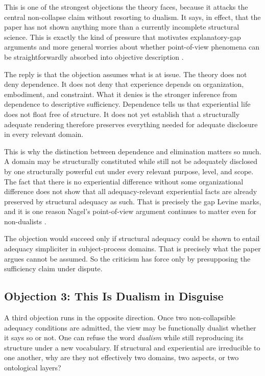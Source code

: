 \documentclass[11pt]{article}
\renewcommand{\emph}[1]{\textit{#1}}
\begin{document}
This is one of the strongest objections the theory faces, because it attacks the central non-collapse claim without resorting to dualism. It says, in effect, that the paper has not shown anything more than a currently incomplete structural science. This is exactly the kind of pressure that motivates explanatory-gap arguments and more general worries about whether point-of-view phenomena can be straightforwardly absorbed into objective description \cite{Nagel1974,Levine1983,Chalmers1995}.

The reply is that the objection assumes what is at issue. The theory does not deny dependence. It does not deny that experience depends on organization, embodiment, and constraint. What it denies is the stronger inference from dependence to descriptive sufficiency. Dependence tells us that experiential life does not float free of structure. It does not yet establish that a structurally adequate rendering therefore preserves everything needed for adequate disclosure in every relevant domain.

This is why the distinction between dependence and elimination matters so much. A domain may be structurally constituted while still not be adequately disclosed by one structurally powerful cut under every relevant purpose, level, and scope. The fact that there is no experiential difference without some organizational difference does not show that all adequacy-relevant experiential facts are already preserved by structural adequacy as such. That is precisely the gap Levine marks, and it is one reason Nagel's point-of-view argument continues to matter even for non-dualists \cite{Nagel1974,Levine1983}.

The objection would succeed only if structural adequacy could be shown to entail adequacy simpliciter in subject-process domains. That is precisely what the paper argues cannot be assumed. So the criticism has force only by presupposing the sufficiency claim under dispute.

\subsection{Objection 3: This Is Dualism in Disguise}

A third objection runs in the opposite direction. Once two non-collapsible adequacy conditions are admitted, the view may be functionally dualist whether it says so or not. One can refuse the word \emph{dualism} while still reproducing its structure under a new vocabulary. If structural and experiential are irreducible to one another, why are they not effectively two domains, two aspects, or two ontological layers?
\end{document}
